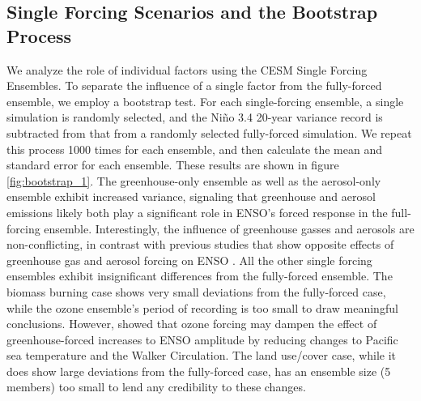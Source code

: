 \documentclass[11pt]{article}
\begin{document}
\subsection{Single Forcing Scenarios and the Bootstrap Process}
\label{sec:org8837c57}
We analyze the role of individual factors using the CESM Single Forcing Ensembles. To separate the influence of a single factor from the fully-forced ensemble, we employ a bootstrap test. For each single-forcing ensemble, a single simulation is randomly selected, and the Niño 3.4 20-year variance record is subtracted from that from a randomly selected fully-forced simulation. We repeat this process 1000 times for each ensemble, and then calculate the mean and standard error for each ensemble. These results are shown in figure \ref{fig:bootstrap_1}. The greenhouse-only ensemble as well as the aerosol-only ensemble exhibit increased variance, signaling that greenhouse and aerosol emissions likely both play a significant role in ENSO's forced response in the full-forcing ensemble. Interestingly, the influence of greenhouse gasses and aerosols are non-conflicting, in contrast with previous studies that show opposite effects of greenhouse gas and aerosol forcing on ENSO \citep{stevenson2019forced}. All the other single forcing ensembles exhibit insignificant differences from the fully-forced ensemble. The biomass burning case shows very small deviations from the fully-forced case, while the ozone ensemble's period of recording is too small to draw meaningful conclusions. However, \citet{nowack2017role} showed that ozone forcing may dampen the effect of greenhouse-forced increases to ENSO amplitude by reducing changes to Pacific sea temperature and the Walker Circulation. The land use/cover case, while it does show large deviations from the fully-forced case, has an ensemble size (5 members) too small to lend any credibility to these changes.
\end{document}
